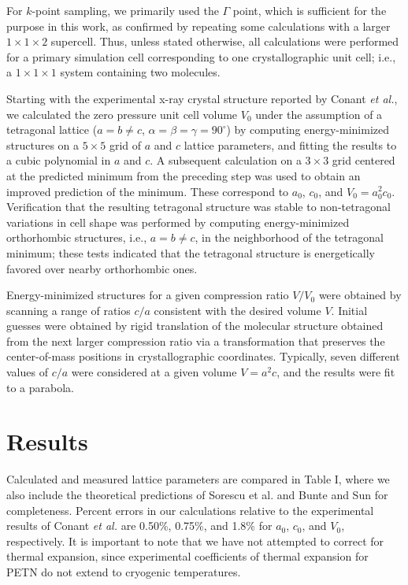 \documentclass[prb,aps,nobibnotes,twocolumn,doublespace,twocolumngrid,superbib]{revtex4}
\begin{document}
For $k$-point sampling, we primarily used the $\Gamma$ point, which is 
sufficient for the purpose in this work, as confirmed by repeating some 
calculations with a larger $1 \times 1 \times 2 $ supercell.
Thus, unless stated otherwise, all calculations were performed for a
primary simulation cell corresponding to one crystallographic
unit cell; i.e., a $1\times 1\times 1 $ system containing two molecules.  

Starting with the experimental x-ray crystal structure reported by
Conant {\it et al.},\cite{Conant_1979} we calculated the zero pressure unit cell volume $V_0$ 
under the assumption of a tetragonal lattice ($a=b\neq c$, 
$\alpha=\beta=\gamma=90^\circ$) by computing energy-minimized structures
on a $5\times 5$ grid of $a$ and $c$ lattice parameters, 
and fitting  the results 
to a cubic polynomial in $a$ and $c$.  A subsequent calculation
on a $3 \times 3$ grid centered at the predicted minimum from the preceding step
was used to obtain an improved prediction of the minimum.  These
correspond to $a_0$, $c_0$, and $V_0=a_0^2c_0$.  Verification that
the resulting tetragonal structure was stable to non-tetragonal variations
in cell shape was performed by computing energy-minimized orthorhombic
structures, i.e., $a=b\neq c$, in the neighborhood of the tetragonal minimum; 
these tests indicated that the tetragonal structure is energetically favored 
over nearby orthorhombic ones.  

Energy-minimized structures for a given compression ratio $V/V_0$ 
were obtained by scanning a range of ratios $c/a$ consistent with the 
desired volume $V$.  Initial guesses were obtained by rigid translation 
of the molecular structure obtained from the next larger compression ratio 
via a transformation that preserves the center-of-mass positions in 
crystallographic coordinates.  Typically, seven different values of
$c/a$ were considered at a given volume $V=a^2c$, and the results were
fit to a parabola.

\section{Results}
\label{sec:results}
Calculated and measured lattice parameters are compared in Table I, where
we also include the theoretical predictions of Sorescu et 
al.\cite{Sorescu_1999v103}  and
Bunte and Sun\cite{Bunte_2000v104}  for completeness.  Percent errors in 
our calculations 
relative to the experimental results of Conant {\it et al.}\cite{Conant_1979} are 0.50\%, 0.75\%, 
and 1.8\% for $a_0$, $c_0$, and $V_0$, respectively.  It is important to note 
that we have not attempted to correct for thermal expansion, since 
experimental coefficients of thermal expansion for PETN do not extend to 
cryogenic temperatures. 
\end{document}
